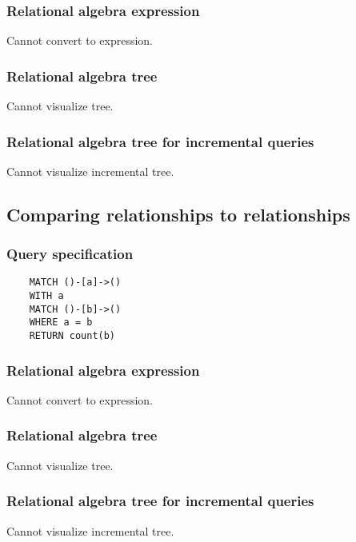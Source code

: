 	\subsubsection*{Relational algebra expression}

	Cannot convert to expression.

	\subsubsection*{Relational algebra tree}

	Cannot visualize tree.

	\subsubsection*{Relational algebra tree for incremental queries}

	Cannot visualize incremental tree.
	\subsection{Comparing relationships to relationships}

	\subsubsection*{Query specification}

	\begin{lstlisting}
	MATCH ()-[a]->()
	WITH a
	MATCH ()-[b]->()
	WHERE a = b
	RETURN count(b)
	\end{lstlisting}


	\subsubsection*{Relational algebra expression}

	Cannot convert to expression.

	\subsubsection*{Relational algebra tree}

	Cannot visualize tree.

	\subsubsection*{Relational algebra tree for incremental queries}

	Cannot visualize incremental tree.


